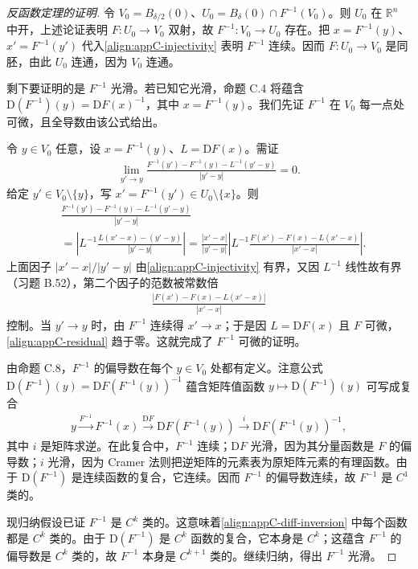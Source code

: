 \documentclass[../../main.tex]{subfiles}
\begin{document}
\begin{proof}[反函数定理的证明]
令 $V_0=B_{\delta/2}(0)$、$U_0=B_\delta(0)\cap F^{-1}(V_0)$。则 $U_0$ 在 $\mathbb R^n$ 中开，上述论证表明 $F:U_0\to V_0$ 双射，故 $F^{-1}:V_0\to U_0$ 存在。把 $x=F^{-1}(y)$、$x'=F^{-1}(y')$ 代入\eqref{align:appC-injectivity} 表明 $F^{-1}$ 连续。因而 $F:U_0\to V_0$ 是同胚，由此 $U_0$ 连通，因为 $V_0$ 连通。

剩下要证明的是 $F^{-1}$ 光滑。若已知它光滑，命题 C.4 将蕴含 $\mathrm{D}(F^{-1})(y)=\mathrm{D}F(x)^{-1}$，其中 $x=F^{-1}(y)$。我们先证 $F^{-1}$ 在 $V_0$ 每一点处可微，且全导数由该公式给出。

令 $y\in V_0$ 任意，设 $x=F^{-1}(y)$、$L=\mathrm{D}F(x)$。需证
\begin{align*}
\lim_{y'\to y}\frac{F^{-1}(y')-F^{-1}(y)-L^{-1}(y'-y)}{|y'-y|}=0.
\end{align*}
给定 $y'\in V_0\setminus\{y\}$，写 $x'=F^{-1}(y')\in U_0\setminus\{x\}$。则
\begin{align*}
&\frac{F^{-1}(y')-F^{-1}(y)-L^{-1}(y'-y)}{|y'-y|}\\
&=\left|L^{-1}\frac{L(x'-x)-(y'-y)}{|y'-y|}\right|
=\frac{|x'-x|}{|y'-y|}\left|L^{-1}\frac{F(x')-F(x)-L(x'-x)}{|x'-x|}\right|.
\end{align*}
上面因子 $|x'-x|/|y'-y|$ 由\eqref{align:appC-injectivity} 有界，又因 $L^{-1}$ 线性故有界（习题 B.52），第二个因子的范数被常数倍
\begin{align}\label{align:appC-residual}
\frac{|F(x')-F(x)-L(x'-x)|}{|x'-x|}
\end{align}
控制。当 $y'\to y$ 时，由 $F^{-1}$ 连续得 $x'\to x$；于是因 $L=\mathrm{D}F(x)$ 且 $F$ 可微，\eqref{align:appC-residual} 趋于零。这就完成了 $F^{-1}$ 可微的证明。

由命题 C.8，$F^{-1}$ 的偏导数在每个 $y\in V_0$ 处都有定义。注意公式 $\mathrm{D}(F^{-1})(y)=\mathrm{D}F(F^{-1}(y))^{-1}$ 蕴含矩阵值函数 $y\mapsto\mathrm{D}(F^{-1})(y)$ 可写成复合
\begin{align}\label{align:appC-diff-inversion}
y\xrightarrow{F^{-1}}F^{-1}(x)\xrightarrow{\mathrm{D}F}\mathrm{D}F(F^{-1}(y))\xrightarrow{i}\mathrm{D}F(F^{-1}(y))^{-1},
\end{align}
其中 $i$ 是矩阵求逆。在此复合中，$F^{-1}$ 连续；$\mathrm{D}F$ 光滑，因为其分量函数是 $F$ 的偏导数；$i$ 光滑，因为 Cramer 法则把逆矩阵的元素表为原矩阵元素的有理函数。由于 $\mathrm{D}(F^{-1})$ 是连续函数的复合，它连续。因而 $F^{-1}$ 的偏导数连续，故 $F^{-1}$ 是 $C^1$ 类的。

现归纳假设已证 $F^{-1}$ 是 $C^k$ 类的。这意味着\eqref{align:appC-diff-inversion} 中每个函数都是 $C^k$ 类的。由于 $\mathrm{D}(F^{-1})$ 是 $C^k$ 函数的复合，它本身是 $C^k$；这蕴含 $F^{-1}$ 的偏导数是 $C^k$ 类的，故 $F^{-1}$ 本身是 $C^{k+1}$ 类的。继续归纳，得出 $F^{-1}$ 光滑。
\end{proof}
\end{document}
